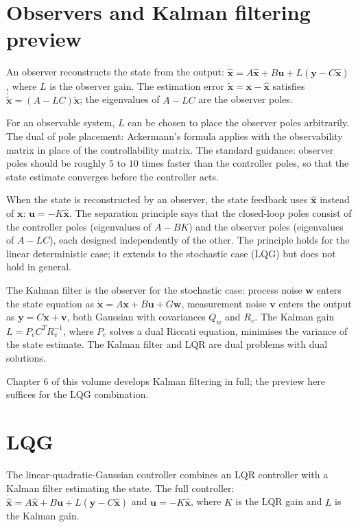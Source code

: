 \section{Observers and Kalman filtering preview}

An observer reconstructs the state from the output: $\dot{\hat{\mathbf{x}}} = A \hat{\mathbf{x}} + B \mathbf{u} + L(\mathbf{y} - C \hat{\mathbf{x}})$, where $L$ is the observer gain. The estimation error $\tilde{\mathbf{x}} = \mathbf{x} - \hat{\mathbf{x}}$ satisfies $\dot{\tilde{\mathbf{x}}} = (A - LC) \tilde{\mathbf{x}}$; the eigenvalues of $A - LC$ are the observer poles.

For an observable system, $L$ can be chosen to place the observer poles arbitrarily. The dual of pole placement: Ackermann's formula applies with the observability matrix in place of the controllability matrix. The standard guidance: observer poles should be roughly $5$ to $10$ times faster than the controller poles, so that the state estimate converges before the controller acts.

When the state is reconstructed by an observer, the state feedback uses $\hat{\mathbf{x}}$ instead of $\mathbf{x}$: $\mathbf{u} = -K \hat{\mathbf{x}}$. The separation principle says that the closed-loop poles consist of the controller poles (eigenvalues of $A - BK$) and the observer poles (eigenvalues of $A - LC$), each designed independently of the other. The principle holds for the linear deterministic case; it extends to the stochastic case (LQG) but does not hold in general.

The Kalman filter is the observer for the stochastic case: process noise $\mathbf{w}$ enters the state equation as $\dot{\mathbf{x}} = A \mathbf{x} + B \mathbf{u} + G \mathbf{w}$, measurement noise $\mathbf{v}$ enters the output as $\mathbf{y} = C \mathbf{x} + \mathbf{v}$, both Gaussian with covariances $Q_w$ and $R_v$. The Kalman gain $L = P_e C^T R_v^{-1}$, where $P_e$ solves a dual Riccati equation, minimises the variance of the state estimate. The Kalman filter and LQR are dual problems with dual solutions.

Chapter 6 of this volume develops Kalman filtering in full; the preview here suffices for the LQG combination.

\section{LQG}

The linear-quadratic-Gaussian controller combines an LQR controller with a Kalman filter estimating the state. The full controller: $\dot{\hat{\mathbf{x}}} = A \hat{\mathbf{x}} + B \mathbf{u} + L(\mathbf{y} - C \hat{\mathbf{x}})$ and $\mathbf{u} = -K \hat{\mathbf{x}}$, where $K$ is the LQR gain and $L$ is the Kalman gain.

